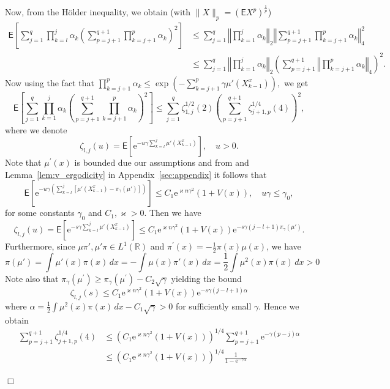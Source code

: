 \documentclass[bj]{imsart}
\def\rme{\mathrm{e}}
\newcommand{\proofendsign}{$\Box$}
\newenvironment{proof}{{\noindent \bf Proof }}
 {{\hspace*{\fill}\proofendsign\par\bigskip}}
\begin{document}
\begin{proof}
Now, from the H\"older inequality, we obtain (with $\|X\|_p = (\mathsf{E}X^p)^{\frac{1}{p}}$)
\begin{align*}
\mathsf{E}\left[\sum_{j=1}^{q}\prod_{k=l}^{j}\alpha_{k}\left( \sum_{p=j+1}^{q+1}\prod_{k=j+1}^{p}\alpha_{k}\right)^{2}\right] & \leq\sum_{j=1}^{q}\left\Vert \prod_{k=1}^{j}\alpha_{k}\right\Vert _{2}\left\Vert \sum_{p=j+1}^{q+1} \prod_{k=j+1}^{p}\alpha_{k}\right\Vert _{4}^{2}\\
 & \leq\sum_{j=1}^{q} \left\Vert \prod_{k=1}^{j}\alpha_{k}\right\Vert _{2}\left(\sum_{p=j+1}^{q+1}\left\Vert \prod_{k=j+1}^{p}\alpha_{k}\right\Vert _{4}\right)^{2}.
\end{align*}
Now using the fact that $\prod\limits_{k=j+1}^{p}\alpha_{k} \leq \exp\left(-\sum\limits_{k=j+1}^{p}\gamma\mu'(X_{k-1}^x)\right),$
we get
\[
\mathsf{E}\left[\sum_{j=1}^{q}\prod_{k=1}^{j}\alpha_{k}\left(\sum_{p=j+1}^{q+1}\prod_{k=j+1}^{p}\alpha_{k}\right)^{2}\right]\leq\sum_{j=1}^{q} \zeta^{1/2}_{1,j}(2) \left(\sum_{p=j+1}^{q+1} \zeta^{1/4}_{j+1,p}(4)\right)^{2},
\]
where we denote
\[
\zeta_{l,j}(u)=\mathsf{E}\left[\rme^{-u\gamma\sum_{k=l}^{j}\mu'(X^x_{k-1})}\right],\quad u>0.
\]
Note that $\mu^{\prime}(x)$ is bounded due  our assumptions and from \cite[Theorem~1]{delyon1999small} and Lemma~\ref{lem:v_ergodicity} in Appendix~\ref{sec:appendix} it follows that
\[
\mathsf{E}\left[\rme^{-u\gamma\left(\sum_{k=l}^{j}[\mu'(X^x_{k-1})-\pi_\gamma(\mu')]\right)}\right]\leq C_1 \rme^{\varkappa n\gamma^2}(1+V(x)),\quad u\gamma\leq \gamma_0,
\]
for some constants $\gamma_0$ and $C_1,\varkappa>0$. Then we have
\[
\zeta_{l,j}(u)=\mathsf{E}\left[\rme^{-s\gamma\sum_{k=l}^{j}\mu'(X^x_{k-1})}\right]\leq  C_1 \rme^{\varkappa n\gamma^2}(1+V(x)) \rme^{-s\gamma (j-l+1)\pi_\gamma(\mu')}.
\]
Furthermore, since $\mu\pi',\mu'\pi\in L^{1}(\mathbb{R})$ and $\pi^{\prime}(x) = -\frac{1}{2}\pi(x)\mu(x)$, we have
\[
\pi(\mu')=\int\mu'(x)\pi(x)\,dx=-\int\mu(x)\pi'(x)\,dx=\frac{1}{2}\int\mu^{2}(x)\pi(x)\,dx>0
\]
Note also that \(\pi_\gamma(\mu^{\prime}) \geq \pi_\gamma(\mu^{\prime}) - C_2\sqrt{\gamma}\)
yielding the bound
\[
\zeta_{l,j}(s) \leq  C_1 \rme^{\varkappa n\gamma^2}(1+V(x)) \rme^{-s\gamma(j-l+1)\alpha}
\]
where $ \alpha = \frac{1}{2}\int \mu^2(x)\pi(x)\,dx - C_1\sqrt{\gamma} > 0$ for sufficiently small $\gamma$. Hence we obtain
\begin{align*}
\sum_{p=j+1}^{q+1} \zeta^{1/4}_{j+1,p}(4) &\leq (C_1 \rme^{\varkappa n\gamma^2}(1+V(x)))^{1/4}\sum_{p=j+1}^{q+1} \rme^{-\gamma(p-j)\alpha}
\\
&\leq  (C_1 \rme^{\varkappa n\gamma^2}(1+V(x)))^{1/4}\frac{1}{1- \rme^{- \gamma\alpha}}

\end{align*}
\end{proof}
\end{document}
